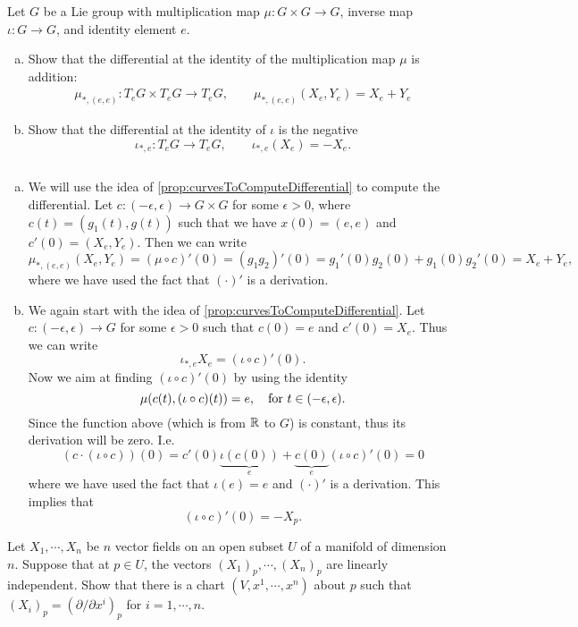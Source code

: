 \begin{problem}
	Let $ G $ be a Lie group with multiplication map $ \mu:G\times G \to G $, inverse map $ \iota: G \to G $, and identity element $ e $. 
	\begin{enumerate}[(a)]
		\item Show that the differential at the identity of the multiplication map $ \mu $ is addition:
		\begin{align*}
			\mu_{*,(e,e)}: T_eG \times T_eG \to T_e G, \qquad \mu_{*,(e,e)}(X_e,Y_e) = X_e + Y_e
		\end{align*}
		\item Show that the differential at the identity of $ \iota $ is the negative
		\[ \iota_{*,e}: T_eG \to T_eG, \qquad \iota_{*,e}(X_e) = -X_e. \]
	\end{enumerate}
\end{problem}
\begin{solution}
	$ \ $\\
	\begin{enumerate}[(a)]
		\item We will use the idea of \autoref{prop:curvesToComputeDifferential} to compute the differential. Let $ c:(-\epsilon,\epsilon) \to G\times G $ for some $ \epsilon>0 $, where $ c(t) = (g_1(t),g(t)) $ such that we have $ x(0) = (e,e) $ and $ c'(0)=(X_e,Y_e)$. Then we can write
		\[ \mu_{*,(e,e)} (X_e,Y_e) = (\mu \circ c)'(0) = (g_1g_2)'(0) = g_1'(0)g_2(0) + g_1(0)g_2'(0) = X_e + Y_e, \]
		where we have used the fact that $ (\cdot)' $ is a derivation.
		\item We again start with the idea of \autoref{prop:curvesToComputeDifferential}. Let $ c:(-\epsilon,\epsilon) \to G $ for some $ \epsilon>0 $ such that $ c(0) = e $ and $ c'(0) = X_e $. Thus we can write
		\[ \iota_{*,e} X_e = (\iota \circ c)'(0). \]
		Now we aim at finding $ (\iota \circ c)'(0) $ by using the identity
		\[ \mu(c(t), (\iota \circ c)(t)) = e, \quad \text{for $ t\in (-\epsilon,\epsilon) $}. \]
		Since the function above (which is from $ \mathbb{R} $ to $ G $) is constant, thus its derivation will be zero. I.e.
		\[ (c \cdot (\iota\circ c))(0) = c'(0)\underbrace{\iota(c(0))}_{e} + \underbrace{c(0)}_e(\iota\circ c)'(0) = 0 \]
		where we have used the fact that $ \iota(e) = e $ and $ (\cdot)' $ is a derivation. This implies that 
		\[ (\iota \circ c)'(0) = -X_p. \]
	\end{enumerate}
\end{solution}

\begin{problem}
	Let $ X_1,\cdots,X_n $ be $ n $ vector fields on an open subset $ U $ of a manifold of dimension $ n $. Suppose that at $ p \in U $, the vectors $ (X_1)_p,\cdots,(X_n)_p $ are linearly independent. Show that there is a chart $ (V,x^1,\cdots,x^n) $ about $ p $ such that $ (X_i)_p = (\partial/\partial x^i)_p $ for $ i = 1,\cdots,n $.
\end{problem}